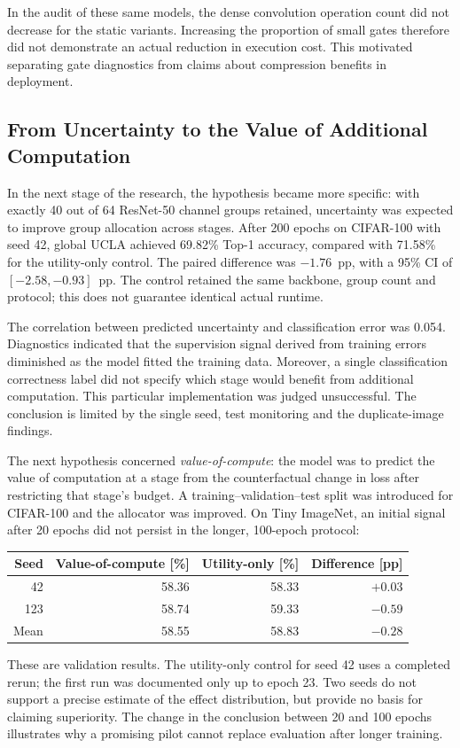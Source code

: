 \documentclass[12pt,a4paper]{article}
\newcommand{\pp}{pp}
\begin{document}
In the audit of these same models, the dense convolution operation count
did not decrease for the static variants.
Increasing the proportion of small gates therefore did not demonstrate
an actual reduction in execution cost. This motivated separating gate
diagnostics from claims about compression benefits in deployment.

\subsection{From Uncertainty to the Value of Additional Computation}

In the next stage of the research, the hypothesis became more specific:
with exactly 40 out of 64 ResNet-50 channel groups retained, uncertainty
was expected to improve group allocation across stages.
After 200 epochs on CIFAR-100 with seed 42, global UCLA achieved
69.82\% Top-1 accuracy, compared with 71.58\% for the utility-only control.
The paired difference was $-1.76$~\pp, with a 95\% CI of
$[-2.58,-0.93]$~\pp.
The control retained the same backbone, group count and protocol;
this does not guarantee identical actual runtime.

The correlation between predicted uncertainty and classification error
was 0.054. Diagnostics indicated that the supervision signal derived
from training errors diminished as the model fitted the training data.
Moreover, a single classification correctness label did not specify
which stage would benefit from additional computation.
This particular implementation was judged unsuccessful.
The conclusion is limited by the single seed, test monitoring and
the duplicate-image findings.

The next hypothesis concerned \emph{value-of-compute}: the model was to
predict the value of computation at a stage from the counterfactual
change in loss after restricting that stage's budget.
A training--validation--test split was introduced for CIFAR-100 and
the allocator was improved. On Tiny ImageNet, an initial signal after
20 epochs did not persist in the longer, 100-epoch protocol:
\begin{center}
\begin{tabular}{@{}rrrr@{}}
\toprule
Seed & Value-of-compute [\%] & Utility-only [\%] & Difference [\pp] \\
\midrule
42 & 58.36 & 58.33 & $+0.03$ \\
123 & 58.74 & 59.33 & $-0.59$ \\
Mean & 58.55 & 58.83 & $-0.28$ \\
\bottomrule
\end{tabular}
\end{center}
These are validation results. The utility-only control for seed 42 uses
a completed rerun; the first run was documented only up to epoch 23.
Two seeds do not support a precise estimate
of the effect distribution, but provide no basis for claiming superiority.
The change in the conclusion between 20 and 100 epochs illustrates why
a promising pilot cannot replace evaluation after longer training.
\end{document}
